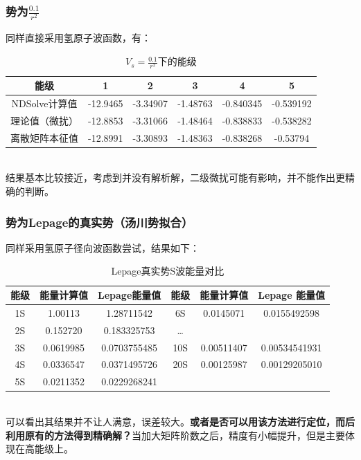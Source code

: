 \documentclass[hyperref,cs4size,titlepage,twoside]{ctexart}
\begin{document}
\subsubsection{势为$\displaystyle\frac{0.1}{r^2}$}
同样直接采用氢原子波函数，有：
\begin{table}[!htbp]
  \centering
  \begin{tabular}{|c|c|c|c|c|c|}
    \hline
    能级 & 1 & 2 & 3 & 4 & 5 \\
    \hline
    NDSolve计算值 & -12.9465 & -3.34907 & -1.48763 & -0.840345 & -0.539192 \\
    \hline
    理论值（微扰） & -12.8853 & -3.31066 & -1.48464 & -0.838833 & -0.538282 \\
    \hline
    离散矩阵本征值 & -12.8991 & -3.30893 & -1.48363 & -0.838268 & -0.53794 \\
    \hline
  \end{tabular}
  \caption{$\displaystyle V_s=\frac{0.1}{r^2}$下的能级}
\end{table}\\
结果基本比较接近，考虑到并没有解析解，二级微扰可能有影响，并不能作出更精确的判断。
\clearpage
\subsubsection{势为Lepage的真实势（汤川势拟合）}
同样采用氢原子径向波函数尝试，结果如下：
\begin{table}[!htb]
  \centering
  \begin{tabular}{|cccccc|}
    \hline
    能级 & 能量计算值 & Lepage能量值 & 能级 & 能量计算值 & Lepage 能量值 \\
    \hline
    1S & 1.00113 & 1.28711542 & 6S & 0.0145071 & 0.0155492598 \\
    2S & 0.152720 & 0.183325753  & \dots &   & \\
    3S & 0.0619985 & 0.0703755485 & 10S & 0.00511407 & 0.00534541931 \\
    4S & 0.0336547 & 0.0371495726 & 20S & 0.00125987 & 0.00129205010 \\
    5S & 0.0211352 & 0.0229268241  &  &  &  \\
    \hline
  \end{tabular}
  \caption{Lepage真实势S波能量对比}
\end{table}\\
可以看出其结果并不让人满意，误差较大。\textbf{或者是否可以用该方法进行定位，而后利用原有的方法得到精确解？}当加大矩阵阶数之后，精度有小幅提升，但是主要体现在高能级上。
\end{document}
